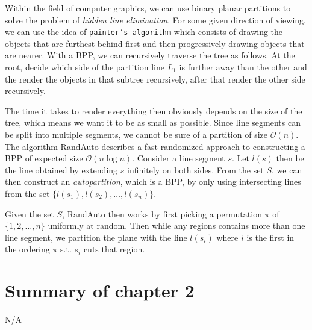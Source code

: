 \documentclass[a4paper]{article}
\begin{document}
Within the field of computer graphics, we can use binary planar partitions to solve the problem of \textit{hidden line elimination}. For some given direction of viewing, we can use the idea of \texttt{painter's algorithm} which consists of drawing the objects that are furthest behind first and then progressively drawing objects that are nearer. With a BPP, we can recursively traverse the tree as follows. At the root, decide which side of the partition line $L_1$ is further away than the other
and the render the objects in that subtree recursively, after that render the other side recursively.

The time it takes to render everything then obviously depends on the size of the tree, which means we want it to be as small as possible. Since line segments can be split into multiple segments, we cannot be sure of a partition of size $\mathcal{O}(n)$.\\

The algorithm RandAuto describes a fast randomized approach to constructing a BPP of expected size $\mathcal{O}(n\log n)$. Consider a line segment $s$. Let $l(s)$ then be the line obtained by extending $s$ infinitely on both sides. From the set $S$, we can then construct an \textit{autopartition}, which is a BPP, by only using intersecting lines from the set $\{l(s_1), l(s_2),\ldots,l(s_n)\}$.

Given the set $S$, RandAuto then works by first picking a permutation $\pi$ of $\{1,2,\ldots,n\}$ uniformly at random. Then while any regions contains more than one line segment, we partition the plane with the line $l(s_i)$ where $i$ is the first in the ordering $\pi$ s.t. $s_i$ cuts that region.


\section*{Summary of chapter 2}
N/A
\end{document}
